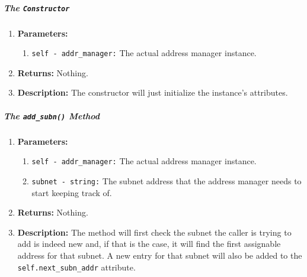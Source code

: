         \subparagraph{The \texttt{Constructor}}
            \begin{enumerate}
                \item \textbf{Parameters:}
                \begin{enumerate}
                    \item \texttt{self - addr\_manager:} The actual address manager instance.
                \end{enumerate}
                \item \textbf{Returns:} Nothing.
                \item \textbf{Description:} The constructor will just initialize the instance's attributes.
            \end{enumerate}

        \subparagraph{The \texttt{add\_subn()} Method}
            \begin{enumerate}
                \item \textbf{Parameters:}
                \begin{enumerate}
                    \item \texttt{self - addr\_manager:} The actual address manager instance.
                    \item \texttt{subnet - string:} The subnet address that the address manager needs to start keeping track of.
                \end{enumerate}
                \item \textbf{Returns:} Nothing.
                \item \textbf{Description:} The method will first check the subnet the caller is trying to add is indeed new and, if that is the case, it will find the first assignable address for that subnet. A new entry for that subnet will also be added to the \texttt{self.next\_subn\_addr} attribute.
            \end{enumerate}


